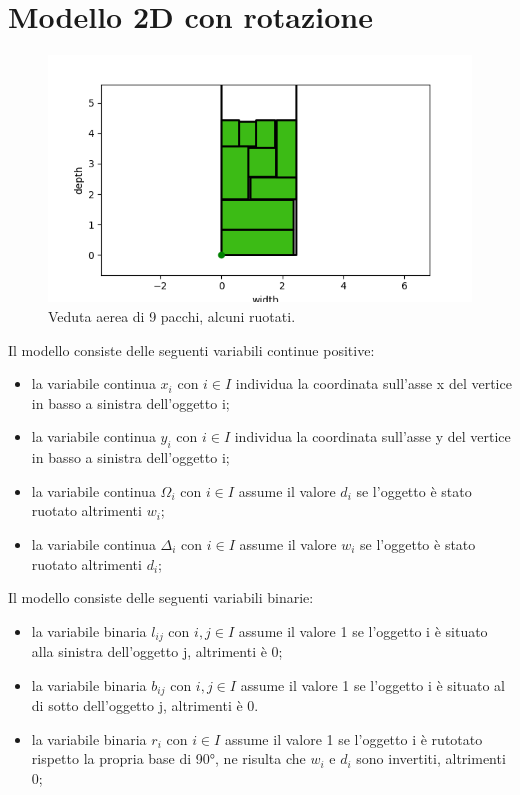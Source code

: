 \section{Modello 2D con rotazione}
\begin{figure}[H]
	\begin{center} \includegraphics[scale=0.6]{figures/2dr}
		\caption[Pacchi ruotati]{Veduta aerea di 9 pacchi, alcuni ruotati.}
		\label{fig:pacchi_ruotati}
	\end{center}
\end{figure}

\noindent Il modello consiste delle seguenti variabili continue positive:
\begin{itemize}
	\item la variabile continua $x_{i}$ con $i \in I$ individua la coordinata sull'asse x del vertice in basso a sinistra dell'oggetto i;
	\item la variabile continua $y_{i}$ con $i \in I$ individua la coordinata sull'asse y del vertice in basso a sinistra dell'oggetto i;
	\item la variabile continua $\Omega_{i}$ con $i \in I$ assume il valore $d_i$ se l'oggetto è stato ruotato altrimenti $w_i$;
	\item la variabile continua $\Delta_{i}$ con $i \in I$ assume il valore $w_i$ se l'oggetto è stato ruotato altrimenti $d_i$;
\end{itemize}
Il modello consiste delle seguenti variabili binarie:
\begin{itemize}
	\item la variabile binaria $l_{ij}$ con $i,j \in I$ assume il valore 1 se l'oggetto i è situato alla sinistra dell'oggetto j, altrimenti è 0;
	\item la variabile binaria $b_{ij}$ con $i,j \in I$ assume il valore 1 se l'oggetto i è situato al di sotto dell'oggetto j, altrimenti è 0.
	\item la variabile binaria $r_{i}$ con $i \in I$ assume il valore 1 se l'oggetto i è rutotato rispetto la propria base di 90°, ne risulta che $w_{i}$ e $d_{i}$ sono invertiti, altrimenti 0;
\end{itemize}

